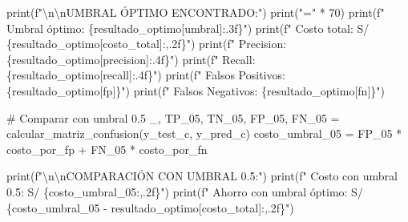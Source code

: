 \documentclass[
  doc,
  floatsintext,
  longtable,
  a4paper,
  nolmodern,
  notxfonts,
  notimes,
  12pt,
  colorlinks=true,linkcolor=blue,citecolor=blue,urlcolor=blue]{apa7}
\newenvironment{Shaded}{\begin{snugshade}}{\end{snugshade}}
\newcommand{\BuiltInTok}[1]{\textcolor[rgb]{0.00,0.23,0.31}{#1}}
\newcommand{\CharTok}[1]{\textcolor[rgb]{0.13,0.47,0.30}{#1}}
\newcommand{\CommentTok}[1]{\textcolor[rgb]{0.37,0.37,0.37}{#1}}
\newcommand{\DecValTok}[1]{\textcolor[rgb]{0.68,0.00,0.00}{#1}}
\newcommand{\NormalTok}[1]{\textcolor[rgb]{0.00,0.23,0.31}{#1}}
\newcommand{\OperatorTok}[1]{\textcolor[rgb]{0.37,0.37,0.37}{#1}}
\newcommand{\SpecialCharTok}[1]{\textcolor[rgb]{0.37,0.37,0.37}{#1}}
\newcommand{\SpecialStringTok}[1]{\textcolor[rgb]{0.13,0.47,0.30}{#1}}
\newcommand{\StringTok}[1]{\textcolor[rgb]{0.13,0.47,0.30}{#1}}
\begin{document}
\begin{Shaded}
\begin{Highlighting}[]
\BuiltInTok{print}\NormalTok{(}\SpecialStringTok{f"}\CharTok{\textbackslash{}n\textbackslash{}n}\SpecialStringTok{UMBRAL ÓPTIMO ENCONTRADO:"}\NormalTok{)}
\BuiltInTok{print}\NormalTok{(}\StringTok{"="} \OperatorTok{*} \DecValTok{70}\NormalTok{)}
\BuiltInTok{print}\NormalTok{(}\SpecialStringTok{f"  Umbral óptimo: }\SpecialCharTok{\{}\NormalTok{resultado\_optimo[}\StringTok{\textquotesingle{}umbral\textquotesingle{}}\NormalTok{]}\SpecialCharTok{:.3f\}}\SpecialStringTok{"}\NormalTok{)}
\BuiltInTok{print}\NormalTok{(}\SpecialStringTok{f"  Costo total: S/ }\SpecialCharTok{\{}\NormalTok{resultado\_optimo[}\StringTok{\textquotesingle{}costo\_total\textquotesingle{}}\NormalTok{]}\SpecialCharTok{:,.2f\}}\SpecialStringTok{"}\NormalTok{)}
\BuiltInTok{print}\NormalTok{(}\SpecialStringTok{f"  Precision: }\SpecialCharTok{\{}\NormalTok{resultado\_optimo[}\StringTok{\textquotesingle{}precision\textquotesingle{}}\NormalTok{]}\SpecialCharTok{:.4f\}}\SpecialStringTok{"}\NormalTok{)}
\BuiltInTok{print}\NormalTok{(}\SpecialStringTok{f"  Recall: }\SpecialCharTok{\{}\NormalTok{resultado\_optimo[}\StringTok{\textquotesingle{}recall\textquotesingle{}}\NormalTok{]}\SpecialCharTok{:.4f\}}\SpecialStringTok{"}\NormalTok{)}
\BuiltInTok{print}\NormalTok{(}\SpecialStringTok{f"  Falsos Positivos: }\SpecialCharTok{\{}\NormalTok{resultado\_optimo[}\StringTok{\textquotesingle{}fp\textquotesingle{}}\NormalTok{]}\SpecialCharTok{\}}\SpecialStringTok{"}\NormalTok{)}
\BuiltInTok{print}\NormalTok{(}\SpecialStringTok{f"  Falsos Negativos: }\SpecialCharTok{\{}\NormalTok{resultado\_optimo[}\StringTok{\textquotesingle{}fn\textquotesingle{}}\NormalTok{]}\SpecialCharTok{\}}\SpecialStringTok{"}\NormalTok{)}

\CommentTok{\# Comparar con umbral 0.5}
\NormalTok{\_, TP\_05, TN\_05, FP\_05, FN\_05 }\OperatorTok{=}\NormalTok{ calcular\_matriz\_confusion(y\_test\_c, y\_pred\_c)}
\NormalTok{costo\_umbral\_05 }\OperatorTok{=}\NormalTok{ FP\_05 }\OperatorTok{*}\NormalTok{ costo\_por\_fp }\OperatorTok{+}\NormalTok{ FN\_05 }\OperatorTok{*}\NormalTok{ costo\_por\_fn}

\BuiltInTok{print}\NormalTok{(}\SpecialStringTok{f"}\CharTok{\textbackslash{}n\textbackslash{}n}\SpecialStringTok{COMPARACIÓN CON UMBRAL 0.5:"}\NormalTok{)}
\BuiltInTok{print}\NormalTok{(}\SpecialStringTok{f"  Costo con umbral 0.5: S/ }\SpecialCharTok{\{}\NormalTok{costo\_umbral\_05}\SpecialCharTok{:,.2f\}}\SpecialStringTok{"}\NormalTok{)}
\BuiltInTok{print}\NormalTok{(}\SpecialStringTok{f"  Ahorro con umbral óptimo: S/ }\SpecialCharTok{\{}\NormalTok{costo\_umbral\_05 }\OperatorTok{{-}}\NormalTok{ resultado\_optimo[}\StringTok{\textquotesingle{}costo\_total\textquotesingle{}}\NormalTok{]}\SpecialCharTok{:,.2f\}}\SpecialStringTok{"}\NormalTok{)}


\end{Highlighting}
\end{Shaded}
\end{document}
